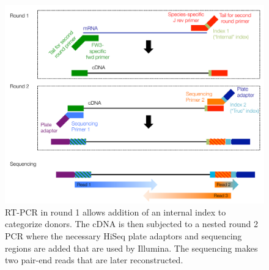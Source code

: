 \begin{figure}
   \centering
   \includegraphics[scale=.5]{images/chapter3/figure3_6.pdf} %
   \caption[Overview of HiSeq Scheme]{RT-PCR in round 1 allows addition of an internal index to categorize donors. The cDNA is then subjected to a nested round 2 PCR where the necessary HiSeq plate adaptors and sequencing regions are added that are used by Illumina. The sequencing makes two pair-end reads that are later reconstructed.}
   \label{fig:figure3_6}
\end{figure}


